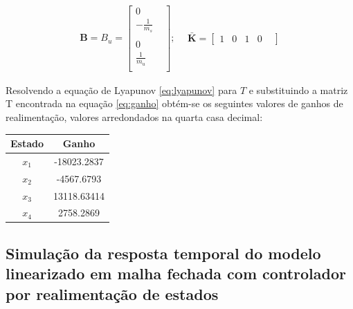 \documentclass[a4paper]{ifacconf}
\begin{document}
    \begin{equation*} 
    \begin{split}
        \mathbf{B} = B_u = 
        \begin{bmatrix}
            0 & \\
            -\frac{1}{m_s}&\\ \\
            0 & \\
            \frac{1}{m_u} \\
        \end{bmatrix};\ \
    \end{split}
    \begin{split}
    \mathbf{\bar{K}} =
        \begin{bmatrix}
        1&0&1&0&
        \end{bmatrix}
    \end{split}
    \end{equation*} 
    
    Resolvendo a equação de Lyapunov \ref{eq:lyapunov} para $T$ e substituindo a matriz T encontrada na equação \ref{eq:ganho} obtém-se os seguintes valores de ganhos de realimentação, valores arredondados na quarta casa decimal:
    
    \begin{center}
    \begin{tabular}{|c|c|}
        \hline
        Estado & Ganho\\
        \hline
        \hline
        $x_1$    & -18023.2837\\
        $x_2$    & -4567.6793\\
        $x_3$    & 13118.63414\\   
        $x_4$    & 2758.2869 \\
        \hline
    \end{tabular}
    \end{center}
    
        \subsection{Simulação da resposta temporal do modelo linearizado em malha fechada com controlador por realimentação de estados} \label{sc:analise_resposta}
    
\end{document}
